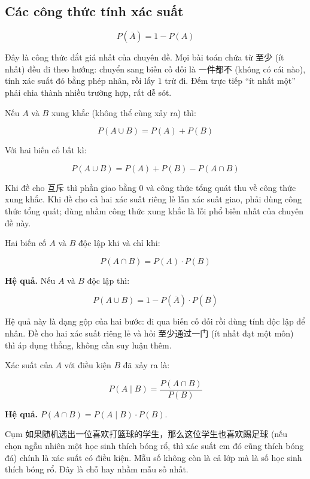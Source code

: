 \documentclass[11pt, a4paper]{article}
\begin{document}
\subsection{Các công thức tính xác suất}

\begin{dinhly}
$$P(\overline{A}) = 1 - P(A)$$

 Đây là công thức đắt giá nhất của chuyên đề. Mọi bài toán chứa từ 至少 (ít nhất) đều đi theo hướng: chuyển sang biến cố đối là 一件都不 (không có cái nào), tính xác suất đó bằng phép nhân, rồi lấy $1$ trừ đi. Đếm trực tiếp “ít nhất một” phải chia thành nhiều trường hợp, rất dễ sót.
\end{dinhly}
\begin{dinhly}
Nếu $A$ và $B$ xung khắc (không thể cùng xảy ra) thì:

$$P(A \cup B) = P(A) + P(B)$$
\end{dinhly}
\begin{dinhly}
Với hai biến cố bất kì:

$$P(A \cup B) = P(A) + P(B) - P(A \cap B)$$

 Khi đề cho 互斥 thì phần giao bằng $0$ và công thức tổng quát thu về công thức xung khắc. Khi đề cho cả hai xác suất riêng lẻ lẫn xác suất giao, phải dùng công thức tổng quát; dùng nhầm công thức xung khắc là lỗi phổ biến nhất của chuyên đề này.
\end{dinhly}
\begin{dinhly}
Hai biến cố $A$ và $B$ độc lập khi và chỉ khi:

$$P(A \cap B) = P(A) \cdot P(B)$$

\textbf{Hệ quả.} Nếu $A$ và $B$ độc lập thì:

$$P(A \cup B) = 1 - P(\overline{A}) \cdot P(\overline{B})$$

 Hệ quả này là dạng gộp của hai bước: đi qua biến cố đối rồi dùng tính độc lập để nhân. Đề cho hai xác suất riêng lẻ và hỏi 至少通过一门 (ít nhất đạt một môn) thì áp dụng thẳng, không cần suy luận thêm.
\end{dinhly}
\begin{dinhly}
Xác suất của $A$ với điều kiện $B$ đã xảy ra là:

$$P(A \mid B) = \frac{P(A \cap B)}{P(B)}$$

\textbf{Hệ quả.} $P(A \cap B) = P(A \mid B) \cdot P(B)$.

 Cụm 如果随机选出一位喜欢打篮球的学生，那么这位学生也喜欢踢足球 (nếu chọn ngẫu nhiên một học sinh thích bóng rổ, thì xác suất em đó cũng thích bóng đá) chính là xác suất có điều kiện. Mẫu số không còn là cả lớp mà là số học sinh thích bóng rổ. Đây là chỗ hay nhầm mẫu số nhất.
\end{dinhly}
\end{document}
